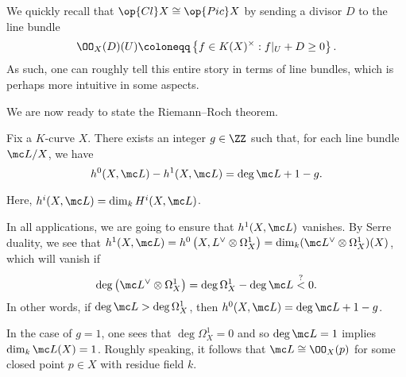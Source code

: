\documentclass[../notes.tex]{subfiles}
\begin{document}
\begin{remark}
	We quickly recall that $\op{Cl}X\cong\op{Pic}X$ by sending a divisor $D$ to the line bundle
	\[\OO_X(D)(U)\coloneqq\left\{f\in K(X)^\times:f|_U+D\ge0\right\}.\]
	As such, one can roughly tell this entire story in terms of line bundles, which is perhaps more intuitive in some aspects.
\end{remark}
We are now ready to state the Riemann--Roch theorem.
\begin{theorem}
	Fix a $K$-curve $X$. There exists an integer $g\in\ZZ$ such that, for each line bundle $\mc L/X$, we have
	\[h^0(X,\mc L)-h^1(X,\mc L)=\deg\mc L+1-g.\]
\end{theorem}
Here, $h^i(X,\mc L)=\dim_kH^i(X,\mc L)$.
\begin{remark}
	In all applications, we are going to ensure that $h^1(X,\mc L)$ vanishes. By Serre duality, we see that $h^1(X,\mc L)=h^0\left(X,L^\lor\otimes\Omega^1_X\right)=\dim_k(\mc L^\lor\otimes\Omega^1_X)(X)$, which will vanish if
	\[\deg\left(\mc L^{\lor}\otimes\Omega^1_X\right)=\deg\Omega^1_X-\deg\mc L\stackrel?<0.\]
	In other words, if $\deg\mc L>\deg\Omega^1_X$, then $h^0(X,\mc L)=\deg\mc L+1-g$.
\end{remark}
\begin{example}
	In the case of $g=1$, one sees that $\deg\Omega^1_X=0$ and so $\deg\mc L=1$ implies $\dim_k\mc L(X)=1$. Roughly speaking, it follows that $\mc L\cong\OO_X(p)$ for some closed point $p\in X$ with residue field $k$.
\end{example}
\end{document}
